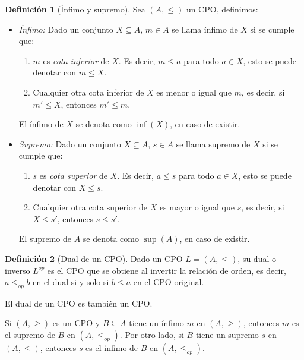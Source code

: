 \documentclass[11pt,oneside]{report}
\theoremstyle{plain}
\theoremstyle{definition}
\newtheorem{defi}{Definición}[chapter]
\begin{document}
\begin{defi}[Ínfimo y supremo]
    Sea $(A,\leq)$ un CPO, definimos:
    \begin{itemize}
        \item \emph{Ínfimo:} Dado un conjunto $X \subseteq A$, $m \in A$ se llama ínfimo de $X$ si se cumple que:
              \begin{enumerate}
                  \item $m$ es \emph{cota inferior} de $X$. Es decir, $m \leq a$ para todo $a \in X$, esto se puede denotar con $m \leq X$.
                  \item Cualquier otra cota inferior de $X$ es menor o igual que $m$, es decir, si $m' \leq X$, entonces $m' \leq m$.
              \end{enumerate}
              El ínfimo de $X$ se denota como $\inf(X)$, en caso de existir.
        \item \emph{Supremo:}  Dado un conjunto $X \subseteq A$, $s \in A$ se llama supremo de $X$ si se cumple que:
              \begin{enumerate}
                  \item $s$ es \emph{cota superior} de $X$. Es decir, $a \leq s$ para todo $a \in X$, esto se puede denotar con $X \leq s$.
                  \item Cualquier otra cota superior de $X$ es mayor o igual que $s$, es decir, si $X \leq s'$, entonces $s\leq s'$.
              \end{enumerate}
              El supremo de $A$ se denota como $\sup(A)$, en caso de existir.
    \end{itemize}
\end{defi}

\begin{defi}[Dual de un CPO]
    Dado un CPO $L=(A,\leq)$, su dual o inverso $L^{op}$ es el CPO que se obtiene al invertir la relación de orden, es decir, $a\leq_{op} b$ en el dual si y solo si $b\leq a$ en el CPO original.

    El dual de un CPO es también un CPO.

    Si $(A, \geq)$ es un CPO y $B \subseteq A$ tiene un ínfimo $m$ en $(A, \geq)$, entonces $m$ es el supremo de $B$ en $(A, \leq_{op} )$. Por otro lado, si $B$ tiene un supremo $s$ en $(A, \leq)$, entonces $s$ es el ínfimo de $B$ en $(A, \leq_{op})$.
\end{defi}
\end{document}
